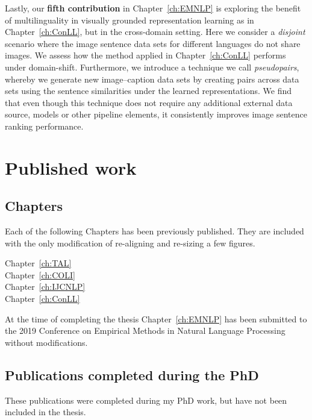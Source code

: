 Lastly, our \textbf{fifth contribution} in Chapter~\ref{ch:EMNLP} is exploring the benefit of multilinguality
in visually grounded representation learning as in Chapter~\ref{ch:ConLL}, but in the cross-domain setting.
Here we consider a \emph{disjoint} scenario where the image sentence data sets for different languages do
not share images. We assess how the method applied in Chapter~\ref{ch:ConLL} performs under
domain-shift. Furthermore, we introduce a technique we call \emph{pseudopairs}, whereby we generate
new image--caption data sets by creating pairs across data sets using the sentence similarities under
the learned representations. We find that even though this technique does not require any additional
external data source, models or other pipeline elements, 
it consistently improves image sentence ranking performance.


\section{Published work}

\subsection{Chapters}

Each of the following Chapters has been previously published. 
They are included with the only modification of re-aligning and re-sizing a few figures.

\begin{description}
	\item[Chapter~\ref{ch:TAL}] 
	\item[Chapter~\ref{ch:COLI}] 
	\item[Chapter~\ref{ch:IJCNLP}] 
	\item[Chapter~\ref{ch:ConLL}] 
\end{description}

At the time of completing the thesis Chapter~\ref{ch:EMNLP} has been submitted to 
the 2019 Conference on Empirical Methods in Natural Language Processing without modifications.

\subsection{Publications completed during the PhD}
These publications were completed during my PhD work, but have not been included in the thesis.

